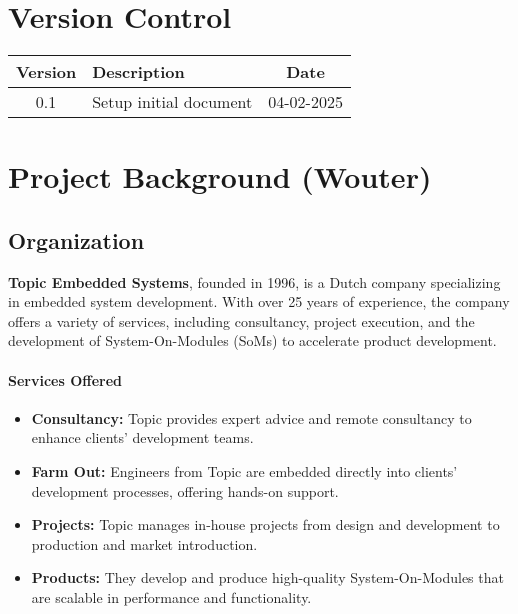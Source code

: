 \documentclass{article}
\begin{document}
\newpage

\section*{Version Control}

\begin{tabular}{|c|l|c|}
    \hline
    Version & Description & Date \\
    \hline
    0.1 & Setup initial document & 04-02-2025 \\
    \hline
\end{tabular}

\newpage

\tableofcontents

\newpage

\section{Project Background (Wouter)}


\subsection{Organization}
\textbf{Topic Embedded Systems}, founded in 1996, is a Dutch company
specializing in embedded system development. With over 25 years of experience,
the company offers a variety of services, including consultancy, project
execution, and the development of System-On-Modules (SoMs) to accelerate product
development.

\paragraph{Services Offered} 
\begin{itemize} 
    \item \textbf{Consultancy:} Topic
        provides expert advice and remote consultancy to enhance clients' development
        teams. 
    \item \textbf{Farm Out:} Engineers from Topic are embedded directly into
        clients' development processes, offering hands-on support. 
    \item \textbf{Projects:} Topic manages in-house projects from design and development
        to production and market introduction. 
    \item \textbf{Products:} They develop and
        produce high-quality System-On-Modules that are scalable in performance and
functionality. \end{itemize}
\end{document}
